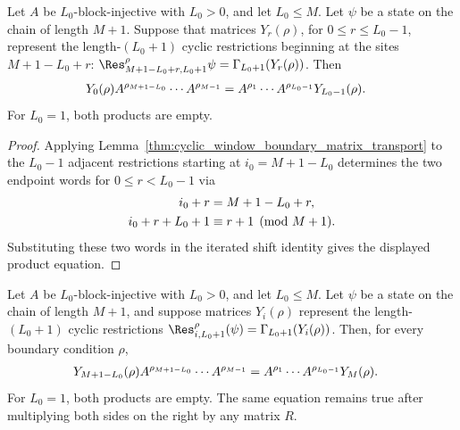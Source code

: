 \begin{lemma}
    \label{lem:boundary_closing_endpoint_word_products}
    \leanok
    Let $A$ be $L_0$-block-injective with $L_0>0$, and let $L_0\le M$.
    Let $\psi$ be a state on the chain of length $M+1$. Suppose that matrices
    $Y_r(\rho)$, for $0\le r\le L_0-1$, represent the length-$(L_0+1)$ cyclic
    restrictions beginning at the sites $M+1-L_0+r$:
    $\Res^\rho_{M+1-L_0+r,L_0+1}\psi =\Gamma_{L_0+1}(Y_r(\rho))$.
    Then
    \begin{align}
        Y_0(\rho)A^{\rho_{M+1-L_0}}\cdots A^{\rho_{M-1}}
         & =A^{\rho_1}\cdots A^{\rho_{L_0-1}}Y_{L_0-1}(\rho). \notag
    \end{align}
    For $L_0=1$, both products are empty.
\end{lemma}

\begin{proof}
    \leanok
    Applying Lemma~\ref{thm:cyclic_window_boundary_matrix_transport} to the
    $L_0-1$ adjacent restrictions starting at $i_0=M+1-L_0$ determines the two
    endpoint words for $0\le r<L_0-1$ via
    \begin{align}
        i_0+r       & =M+1-L_0+r, \notag           \\
        i_0+r+L_0+1 & \equiv r+1\pmod{M+1}. \notag
    \end{align}
    Substituting these two words in the iterated shift identity gives the
    displayed product equation.
\end{proof}

\begin{lemma}
    \label{lem:closure_property_boundary_condition_product_window_witnesses}
    \leanok
    Let $A$ be $L_0$-block-injective with $L_0>0$, and let $L_0\le M$. Let
    $\psi$ be a state on the chain of length $M+1$, and suppose matrices
    $Y_i(\rho)$ represent the length-$(L_0+1)$ cyclic restrictions
    $\Res^\rho_{i,L_0+1}(\psi)=\Gamma_{L_0+1}(Y_i(\rho))$. Then, for every
    boundary condition $\rho$,
    \begin{align}
        Y_{M+1-L_0}(\rho)
        A^{\rho_{M+1-L_0}}\cdots A^{\rho_{M-1}}
         & =A^{\rho_1}\cdots A^{\rho_{L_0-1}}Y_M(\rho). \notag
    \end{align}
    For $L_0=1$, both products are empty. The same equation remains true after
    multiplying both sides on the right by any matrix $R$.
\end{lemma}


